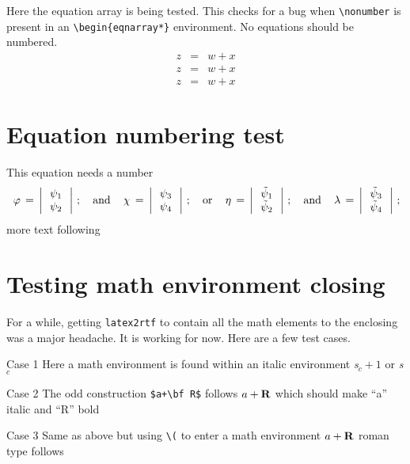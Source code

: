 \documentclass{article}
\begin{document}
Here the equation array is being tested.  This checks for a bug when 
\verb#\nonumber# is present in an \verb#\begin{eqnarray*}# environment.  
No equations should be numbered.
\begin{eqnarray*}
z & = & w + x  \\
z & = & w + x \nonumber\\
z & = & w + x  
\end{eqnarray*}

\section{Equation numbering test}
This equation needs a number 
\begin{equation}\label{ab3}
\,\varphi\,=\,\left|\,
\begin{array}{c}
\psi_1 \\
\psi_2
\end{array}\,\right|\,; \quad {\rm and} \quad
\,\chi\,=\,\left|\,
\begin{array}{c}
\psi_3 \\
\psi_4
\end{array}\,\right|\,; \quad {\rm or} \quad
\,\eta\,=\,\left|\,
\begin{array}{c}
\tilde{\psi}_1 \\
\tilde{\psi}_2
\end{array}\,\right|\,; \quad {\rm and} \quad
\,\lambda\,=\,\left|\,
\begin{array}{c}
\tilde{\psi}_3 \\
\tilde{\psi}_4
\end{array}\,\right|\,;
\end{equation}
more text following

\section{Testing math environment closing}

For a while, getting \texttt{latex2rtf} to contain all the math elements
to the enclosing was a major headache.  It is working for now.  Here are
a few test cases.

Case 1 Here a math environment is found within an italic environment
\textit{s$_c+1$} or {\it s$_c$}

Case 2 The odd construction \verb#$a+\bf R$# follows $a+\bf R$ which
should make ``a'' italic and ``R'' bold

Case 3 Same as above but using \verb#\(# to enter a math environment
\(a+\bf R\) roman type follows
\end{document}
